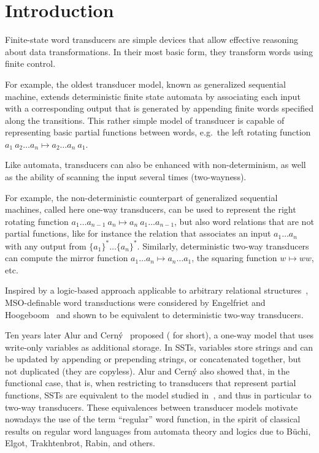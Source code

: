 \documentclass{article}
\providecommand{\AP}{}\NewDocumentCommand{\reintro}{o m}{#2}
\begin{document}
\section{Introduction}\label{sec:intro}
\enlargethispage{-\baselineskip}
Finite-state word transducers are simple devices that allow 
effective reasoning about data transformations. 
In their most basic form, they transform words using finite control. 
\AP
For example, the oldest transducer model, 
known as generalized sequential machine, 
extends deterministic finite state automata by associating each input with a corresponding output
that is generated by appending finite words specified along the transitions.
This rather simple model of transducer is capable of representing 
basic partial functions between words, e.g.~the left 
rotating function $a_1\: a_2\dots a_n\mapsto a_2\dots a_n \: a_1$.
\AP
Like automata, transducers can also be enhanced with non-determinism,
as well as the ability of scanning the input several times (two-wayness).
\AP
For example, the non-deterministic counterpart of 
generalized sequential machines, called here one-way transducers, 
can be used to represent the right rotating function 
$a_1\dots a_{n-1}\: a_n\mapsto a_n\:a_1\dots a_{n-1}$,
but also word relations that are not partial functions, like for 
instance the relation that associates an input $a_1\dots a_n$ 
with any output from $\{a_1\}^*\dots \{a_n\}^*$.
Similarly, deterministic two-way transducers can compute 
the mirror function $a_1\dots a_n \mapsto a_n\dots a_1$,
the squaring function $w \mapsto w w$, etc.

\AP
Inspired by a logic-based approach applicable to arbitrary relational structures~\cite{CE12}, 
MSO-definable word transductions were considered by Engelfriet and
Hoogeboom~\cite{eh01} and shown to be equivalent to deterministic 
two-way transducers.
\AP
Ten years later Alur and Cern{\'y}~\cite{DBLP:conf/fsttcs/AlurC10} proposed 
 ( for short), 
a one-way model that uses write-only variables as additional storage. 
In SSTs, variables store strings and  can be updated by appending or prepending strings, or 
concatenated together, but not duplicated (they are copyless). 
Alur and Cern{\'y} also showed that, in the functional case, 
that is, when restricting to transducers that represent partial functions,
SSTs are equivalent to the model studied in~\cite{eh01},
and thus in particular to two-way transducers.
These equivalences between transducer models motivate nowadays 
the use of the term ``regular'' word function, in the spirit of
classical results on regular word languages from automata theory 
and logics due to B\"uchi, Elgot, Trakhtenbrot, Rabin, and others. 
\end{document}
